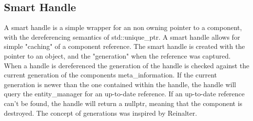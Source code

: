 \subsection{Smart Handle}


A smart handle is a simple wrapper for an non owning pointer to a component, with the dereferencing semantics of std::unique\_ptr. 
A smart handle allows for simple "caching" of a component reference.
The smart handle is created with the pointer to an object, 
and the "generation" when the reference was captured. 
When a handle is dereferenced the generation of the handle is checked against the current generation of the components meta\_information. 
If the current generation is newer than the one contained within the handle, 
the handle will query the entity\_manager for an up-to-date reference.
If an up-to-date reference can't be found, 
the handle will return a nullptr, meaning that the component is destroyed.
The concept of generations was inspired by Reinalter\cite{molecular_musings_internal_references}.
